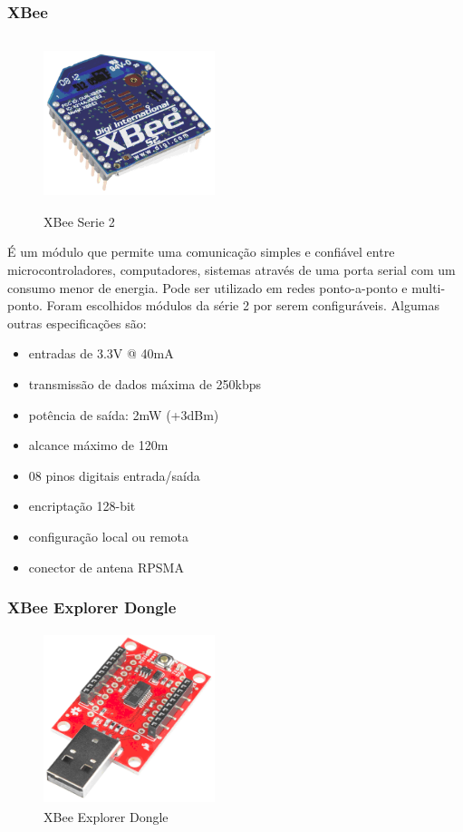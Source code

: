 \subsubsection{XBee}
\begin{figure}[H]
\begin{center}
\includegraphics[width=5cm,height=5cm,keepaspectratio]{figuras/xbee_serie2.png}
\caption{\label{fig:xbee} XBee Serie 2}
\end{center}
\end{figure}

É um módulo que permite uma comunicação simples e confiável entre microcontroladores, computadores, sistemas através de uma porta serial com um consumo menor de energia. Pode ser utilizado em redes ponto-a-ponto e multi-ponto. Foram escolhidos módulos da série 2 por serem configuráveis.
Algumas outras especificações são:

\begin{itemize}
\item{entradas de 3.3V @ 40mA}
\item{transmissão de dados máxima de 250kbps}
\item{potência de saída: 2mW (+3dBm)}
\item{alcance máximo de 120m}
\item{08 pinos digitais entrada/saída}
\item{encriptação 128-bit}
\item{configuração local ou remota}
\item{conector de antena RPSMA}
\end{itemize}
%
\subsubsection{XBee Explorer Dongle}
\begin{figure}[H]
\begin{center}
\includegraphics[width=5cm,height=5cm,keepaspectratio]{figuras/xbee_explorer_dongle.png}
\caption{\label{fig:xbee explorer dongle} XBee Explorer Dongle}
\end{center}
\end{figure}


